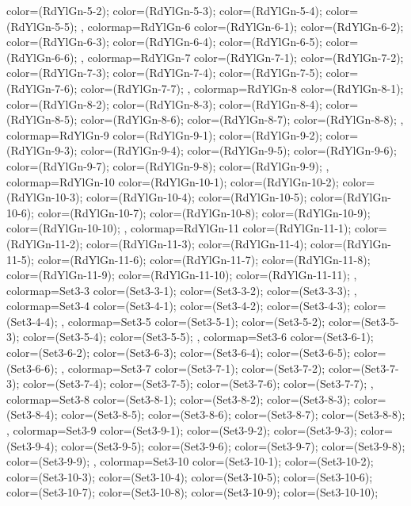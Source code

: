 {{  color=(RdYlGn-5-2);
  color=(RdYlGn-5-3);
  color=(RdYlGn-5-4);
  color=(RdYlGn-5-5);
},
colormap={RdYlGn-6}{
  color=(RdYlGn-6-1);
  color=(RdYlGn-6-2);
  color=(RdYlGn-6-3);
  color=(RdYlGn-6-4);
  color=(RdYlGn-6-5);
  color=(RdYlGn-6-6);
},
colormap={RdYlGn-7}{
  color=(RdYlGn-7-1);
  color=(RdYlGn-7-2);
  color=(RdYlGn-7-3);
  color=(RdYlGn-7-4);
  color=(RdYlGn-7-5);
  color=(RdYlGn-7-6);
  color=(RdYlGn-7-7);
},
colormap={RdYlGn-8}{
  color=(RdYlGn-8-1);
  color=(RdYlGn-8-2);
  color=(RdYlGn-8-3);
  color=(RdYlGn-8-4);
  color=(RdYlGn-8-5);
  color=(RdYlGn-8-6);
  color=(RdYlGn-8-7);
  color=(RdYlGn-8-8);
},
colormap={RdYlGn-9}{
  color=(RdYlGn-9-1);
  color=(RdYlGn-9-2);
  color=(RdYlGn-9-3);
  color=(RdYlGn-9-4);
  color=(RdYlGn-9-5);
  color=(RdYlGn-9-6);
  color=(RdYlGn-9-7);
  color=(RdYlGn-9-8);
  color=(RdYlGn-9-9);
},
colormap={RdYlGn-10}{
  color=(RdYlGn-10-1);
  color=(RdYlGn-10-2);
  color=(RdYlGn-10-3);
  color=(RdYlGn-10-4);
  color=(RdYlGn-10-5);
  color=(RdYlGn-10-6);
  color=(RdYlGn-10-7);
  color=(RdYlGn-10-8);
  color=(RdYlGn-10-9);
  color=(RdYlGn-10-10);
},
colormap={RdYlGn-11}{
  color=(RdYlGn-11-1);
  color=(RdYlGn-11-2);
  color=(RdYlGn-11-3);
  color=(RdYlGn-11-4);
  color=(RdYlGn-11-5);
  color=(RdYlGn-11-6);
  color=(RdYlGn-11-7);
  color=(RdYlGn-11-8);
  color=(RdYlGn-11-9);
  color=(RdYlGn-11-10);
  color=(RdYlGn-11-11);
},
colormap={Set3-3}{
  color=(Set3-3-1);
  color=(Set3-3-2);
  color=(Set3-3-3);
},
colormap={Set3-4}{
  color=(Set3-4-1);
  color=(Set3-4-2);
  color=(Set3-4-3);
  color=(Set3-4-4);
},
colormap={Set3-5}{
  color=(Set3-5-1);
  color=(Set3-5-2);
  color=(Set3-5-3);
  color=(Set3-5-4);
  color=(Set3-5-5);
},
colormap={Set3-6}{
  color=(Set3-6-1);
  color=(Set3-6-2);
  color=(Set3-6-3);
  color=(Set3-6-4);
  color=(Set3-6-5);
  color=(Set3-6-6);
},
colormap={Set3-7}{
  color=(Set3-7-1);
  color=(Set3-7-2);
  color=(Set3-7-3);
  color=(Set3-7-4);
  color=(Set3-7-5);
  color=(Set3-7-6);
  color=(Set3-7-7);
},
colormap={Set3-8}{
  color=(Set3-8-1);
  color=(Set3-8-2);
  color=(Set3-8-3);
  color=(Set3-8-4);
  color=(Set3-8-5);
  color=(Set3-8-6);
  color=(Set3-8-7);
  color=(Set3-8-8);
},
colormap={Set3-9}{
  color=(Set3-9-1);
  color=(Set3-9-2);
  color=(Set3-9-3);
  color=(Set3-9-4);
  color=(Set3-9-5);
  color=(Set3-9-6);
  color=(Set3-9-7);
  color=(Set3-9-8);
  color=(Set3-9-9);
},
colormap={Set3-10}{
  color=(Set3-10-1);
  color=(Set3-10-2);
  color=(Set3-10-3);
  color=(Set3-10-4);
  color=(Set3-10-5);
  color=(Set3-10-6);
  color=(Set3-10-7);
  color=(Set3-10-8);
  color=(Set3-10-9);
  color=(Set3-10-10);
}}
